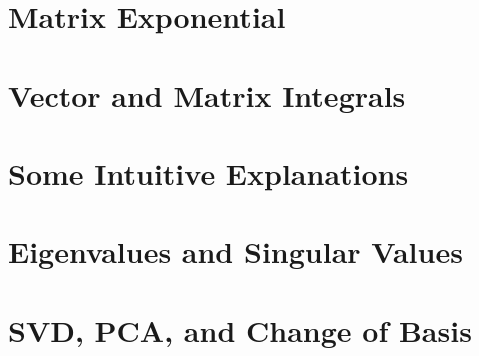 \section{Matrix Exponential}




\section{Vector and Matrix Integrals}


\section{Some Intuitive Explanations}
\section{Eigenvalues and Singular Values}
\section{SVD, PCA, and Change of Basis} 